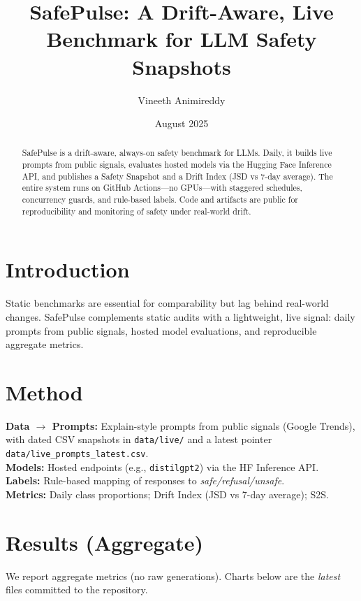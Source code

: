 \documentclass[11pt]{article}
\title{SafePulse: A Drift-Aware, Live Benchmark for LLM Safety Snapshots}
\author{Vineeth Animireddy}
\affil{Independent Researcher}
\date{August 2025}
\begin{document}
\maketitle

\begin{abstract}
SafePulse is a drift-aware, always-on safety benchmark for LLMs. Daily, it builds live prompts from public signals, evaluates hosted models via the Hugging Face Inference API, and publishes a Safety Snapshot and a Drift Index (JSD vs 7-day average). The entire system runs on GitHub Actions---no GPUs---with staggered schedules, concurrency guards, and rule-based labels. Code and artifacts are public for reproducibility and monitoring of safety under real-world drift.
\end{abstract}

\section{Introduction}
Static benchmarks are essential for comparability but lag behind real-world changes. SafePulse complements static audits with a lightweight, live signal: daily prompts from public signals, hosted model evaluations, and reproducible aggregate metrics.

\section{Method}
\textbf{Data $\to$ Prompts:} Explain-style prompts from public signals (Google Trends), with dated CSV snapshots in \texttt{data/live/} and a latest pointer \texttt{data/live\_prompts\_latest.csv}.\\
\textbf{Models:} Hosted endpoints (e.g., \texttt{distilgpt2}) via the HF Inference API.\\
\textbf{Labels:} Rule-based mapping of responses to \emph{safe/refusal/unsafe}.\\
\textbf{Metrics:} Daily class proportions; Drift Index (JSD vs 7-day average); S2S.

\section{Results (Aggregate)}
We report aggregate metrics (no raw generations). Charts below are the \emph{latest} files committed to the repository.
\end{document}
